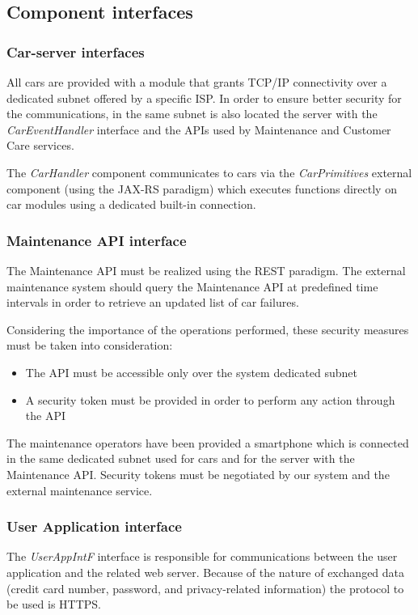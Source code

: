 \clearpage
\subsection{Component interfaces}

\subsubsection{Car-server interfaces}
All cars are provided with a module that grants TCP/IP connectivity over a dedicated subnet offered by a specific ISP. In order to ensure better security for the communications, in the same subnet is also located the server with the \mbox{\emph{CarEventHandler}} interface and the APIs used by Maintenance and Customer Care services.

The \emph{CarHandler} component communicates to cars via the \mbox{\emph{CarPrimitives}} external component (using the JAX-RS paradigm) which executes functions directly on car modules using a dedicated built-in connection.

\subsubsection{Maintenance API interface}
The Maintenance API must be realized using the REST paradigm. The external maintenance system should query the Maintenance API at predefined time intervals in order to retrieve an updated list of car failures.

Considering the importance of the operations performed, these security measures must be taken into consideration:
\begin{itemize}
	\item The API must be accessible only over the system dedicated subnet
	\item A security token must be provided in order to perform any action through the API
\end{itemize}
The maintenance operators have been provided a smartphone which is connected in the same dedicated subnet used for cars and for the server with the Maintenance API.
Security tokens must be negotiated by our system and the external maintenance service.

\subsubsection{User Application interface}
The \emph{UserAppIntF} interface is responsible for communications between the user application and the related web server.
Because of the nature of exchanged data (credit card number, password, and privacy-related information) the protocol to be used is HTTPS.

